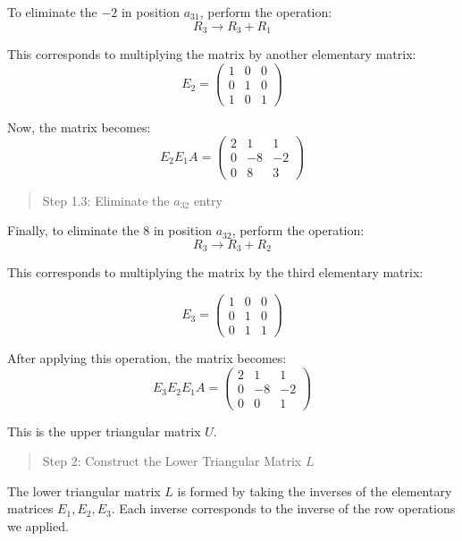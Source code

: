 \documentclass[
  letterpaper,
  DIV=11,
  numbers=noendperiod]{scrreprt}
\theoremstyle{plain}
\theoremstyle{definition}
\theoremstyle{remark}
\begin{document}
To eliminate the \(-2\) in position \(a_{31}\), perform the operation:
\[R_3 \rightarrow R_3 + R_1\]

This corresponds to multiplying the matrix by another elementary matrix:
\[
E_2 = \begin{pmatrix}
1 & 0 & 0 \\
0 & 1 & 0 \\
1 & 0 & 1
\end{pmatrix}
\]

Now, the matrix becomes: \[
E_2 E_1 A = \begin{pmatrix} 
2 & 1 & 1 \\
0 & -8 & -2 \\
0 & 8 & 3
\end{pmatrix}
\]

\begin{quote}
Step 1.3: Eliminate the \(a_{32}\) entry
\end{quote}

Finally, to eliminate the \(8\) in position \(a_{32}\), perform the
operation: \[
R_3 \rightarrow R_3 + R_2
\]

This corresponds to multiplying the matrix by the third elementary
matrix:

\[
E_3 = \begin{pmatrix}
1 & 0 & 0 \\
0 & 1 & 0 \\
0 & 1 & 1
\end{pmatrix}
\]

After applying this operation, the matrix becomes: \[
E_3 E_2 E_1 A = \begin{pmatrix} 
2 & 1 & 1 \\
0 & -8 & -2 \\
0 & 0 & 1
\end{pmatrix}
\]

This is the upper triangular matrix \(U\).

\begin{quote}
Step 2: Construct the Lower Triangular Matrix \(L\)
\end{quote}

The lower triangular matrix \(L\) is formed by taking the inverses of
the elementary matrices \(E_1, E_2, E_3\). Each inverse corresponds to
the inverse of the row operations we applied.
\end{document}
